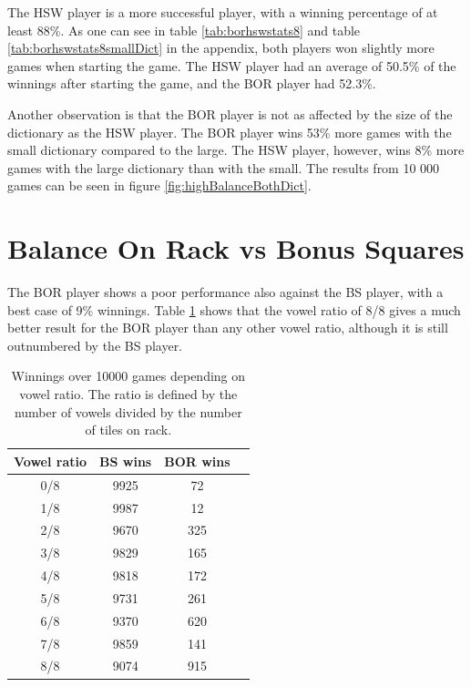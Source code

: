 \documentclass[a4paper, 12pt]{report}
\begin{document}
The HSW player is a more successful player, with a winning percentage of at least 88\%. As one can see in table \ref{tab:borhswstats8} and table \ref{tab:borhswstats8smallDict} in the appendix, both players won slightly more games when starting the game. The HSW player had an average of 50.5\% of the winnings after starting the game, and the BOR player had 52.3\%. 


Another observation is that the BOR player is not as affected by the size of the dictionary as the HSW player. The BOR player wins 53\% more games with the small dictionary compared to the large. The HSW player, however, wins 8\% more games with the large dictionary than with the small. The results from 10 000 games can be seen in figure \ref{fig:highBalanceBothDict}.

\graphicspath{{../results/Plots/}}






\section{Balance On Rack vs Bonus Squares}
\label{sec:balanceBonus}
The BOR player shows a poor performance also against the BS player, with a best case of 9\% winnings. Table \ref{tab:bor+bs} shows that the vowel ratio of 8/8 gives a much better result for the BOR player than any other vowel ratio, although it is still outnumbered by the BS player.

\begin{table}[h]
\centering
    \begin{tabular}{ c | c | c  p{5cm}}
   	Vowel ratio & BS wins & BOR wins \\ \hline
	0/8 & 9925 & 72 \\ 
    	1/8 & 9987 & 12 \\ 
    	2/8 & 9670 & 325 \\ 
    	3/8 & 9829 & 165 \\ 
	4/8 & 9818 & 172 \\ 
	5/8 & 9731 & 261 \\ 
	6/8 & 9370 & 620 \\ 
	7/8 & 9859 & 141 \\ 
	8/8 & 9074 & 915 \\ 
    \end{tabular}
\caption{Winnings over 10000 games depending on vowel ratio. The ratio is defined by the number of vowels divided by the number of tiles on rack.}
\label{tab:bor+bs}
\end{table}
\end{document}
